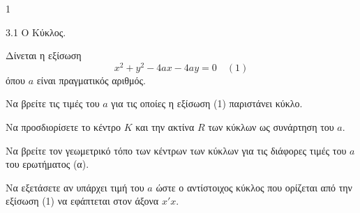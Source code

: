 \begin{ylh}{1}
    \item 3.1 Ο Κύκλος.
\end{ylh}
Δίνεται η εξίσωση
\[ x^2 + y^2 - 4ax - 4ay = 0 \quad (1) \]
όπου $a$ είναι πραγματικός αριθμός.

\begin{alist}
\item Να βρείτε τις τιμές του $a$ για τις οποίες η εξίσωση (1) παριστάνει κύκλο. 
\item Να προσδιορίσετε το κέντρο $K$ και την ακτίνα $R$ των κύκλων ως συνάρτηση του $a$. 
\item Να βρείτε τον γεωμετρικό τόπο των κέντρων των κύκλων για τις διάφορες τιμές του $a$ του ερωτήματος (α). 
\item Να εξετάσετε αν υπάρχει τιμή του $a$ ώστε ο αντίστοιχος κύκλος που ορίζεται από την εξίσωση (1) να εφάπτεται στον άξονα $x'x$. 
\end{alist}